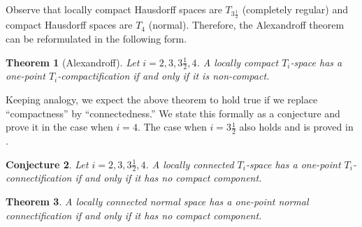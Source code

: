 \documentclass{amsart}
\newtheorem{theorem}{Theorem}
\newtheorem{conjecture}[theorem]{Conjecture}
\newenvironment{proof of claim}{\noindent\textbf{Proof of the claim.}}{\hfill{$\square$}\newline}
\theoremstyle{definition}
\theoremstyle{remark}
\numberwithin{equation}{section}
\begin{document}
Observe that locally compact Hausdorff spaces are $T_{3\frac{1}{2}}$ (completely regular) and compact Hausdorff spaces are $T_4$ (normal). Therefore, the Alexandroff theorem can be reformulated in the following form.

\begin{theorem}[Alexandroff]\label{HFD}
Let $i=2,3,3\frac{1}{2},4$. A locally compact $T_i$-space has a one-point $T_i$-compactification if and only if it is non-compact.
\end{theorem}

Keeping analogy, we expect the above theorem to hold true if we replace ``compactness'' by ``connectedness.'' We state this formally as a conjecture and prove it in the case when $i=4$. The case when $i=3\frac{1}{2}$ also holds and is proved in \cite{Ko}.

\begin{conjecture}\label{JHGH}
Let $i=2,3,3\frac{1}{2},4$. A locally connected $T_i$-space has a one-point $T_i$-connectification if and only if it has no compact component.
\end{conjecture}

\begin{theorem}\label{JJH}
A locally connected normal space has a one-point normal connectification if and only if it has no compact component.
\end{theorem}
\end{document}
